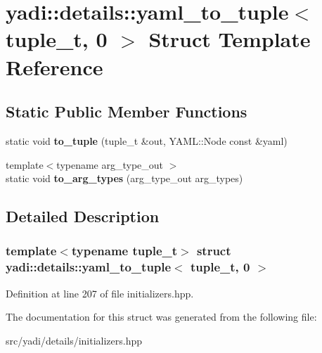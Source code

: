 \hypertarget{structyadi_1_1details_1_1yaml__to__tuple_3_01tuple__t_00_010_01_4}{}\section{yadi\+:\+:details\+:\+:yaml\+\_\+to\+\_\+tuple$<$ tuple\+\_\+t, 0 $>$ Struct Template Reference}
\label{structyadi_1_1details_1_1yaml__to__tuple_3_01tuple__t_00_010_01_4}
\subsection*{Static Public Member Functions}
\begin{DoxyCompactItemize}
\item 
\mbox{\label{structyadi_1_1details_1_1yaml__to__tuple_3_01tuple__t_00_010_01_4_a5d8bce7dc03e42221c09af80cdef2ef5}} 
static void {\bfseries to\+\_\+tuple} (tuple\+\_\+t \&out, Y\+A\+M\+L\+::\+Node const \&yaml)
\item 
\mbox{\label{structyadi_1_1details_1_1yaml__to__tuple_3_01tuple__t_00_010_01_4_a891c11157210a181cf92882730a9940e}} 
{\footnotesize template$<$typename arg\+\_\+type\+\_\+out $>$ }\\static void {\bfseries to\+\_\+arg\+\_\+types} (arg\+\_\+type\+\_\+out arg\+\_\+types)
\end{DoxyCompactItemize}


\subsection{Detailed Description}
\subsubsection*{template$<$typename tuple\+\_\+t$>$\newline
struct yadi\+::details\+::yaml\+\_\+to\+\_\+tuple$<$ tuple\+\_\+t, 0 $>$}



Definition at line 207 of file initializers.\+hpp.



The documentation for this struct was generated from the following file\+:\begin{DoxyCompactItemize}
\item 
src/yadi/details/initializers.\+hpp\end{DoxyCompactItemize}
